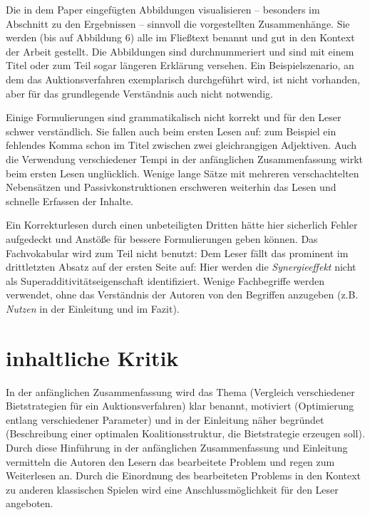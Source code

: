\documentclass[sigconf]{acmart}
\begin{document}
Die in dem Paper eingefügten Abbildungen visualisieren -- besonders im Abschnitt zu den Ergebnissen -- sinnvoll die vorgestellten Zusammenhänge. Sie werden (bis auf Abbildung 6) alle im Fließtext benannt und gut in den Kontext der Arbeit gestellt. Die Abbildungen sind durchnummeriert und sind mit einem Titel oder zum Teil sogar längeren Erklärung versehen. Ein Beispielszenario, an dem das Auktionsverfahren exemplarisch durchgeführt wird, ist nicht vorhanden, aber für das grundlegende Verständnis auch nicht notwendig.

Einige Formulierungen sind grammatikalisch nicht korrekt und für den Leser schwer verständlich. Sie fallen auch beim ersten Lesen auf: zum Beispiel ein fehlendes Komma schon im Titel zwischen zwei gleichrangigen Adjektiven. Auch die Verwendung verschiedener Tempi in der anfänglichen Zusammenfassung wirkt beim ersten Lesen unglücklich. Wenige lange Sätze mit mehreren verschachtelten Nebensätzen und Passivkonstruktionen erschweren weiterhin das Lesen und schnelle Erfassen der Inhalte.

Ein Korrekturlesen durch einen unbeteiligten Dritten hätte hier sicherlich Fehler aufgedeckt und Anstöße für bessere Formulierungen geben können. Das Fachvokabular wird zum Teil nicht benutzt: Dem Leser fällt das prominent im drittletzten Absatz auf der ersten Seite auf: Hier werden die \textit{Synergieeffekt} nicht als Superadditivitätseigenschaft identifiziert. Wenige Fachbegriffe werden verwendet, ohne das Verständnis der Autoren von den Begriffen anzugeben (z.B. \textit{Nutzen} in der Einleitung und im Fazit).


\section{inhaltliche Kritik}
\label{inhalt}
In der anfänglichen Zusammenfassung wird das Thema (Vergleich verschiedener Bietstrategien für ein Auktionsverfahren) klar benannt, motiviert (Optimierung entlang verschiedener Parameter) und in der Einleitung näher begründet (Beschreibung einer optimalen Koalitionsstruktur, die Bietstrategie erzeugen soll).   Durch diese Hinführung in der anfänglichen Zusammenfassung und Einleitung vermitteln die Autoren den Lesern das bearbeitete Problem und regen zum Weiterlesen an. Durch die Einordnung des bearbeiteten Problems in den Kontext zu anderen klassischen Spielen wird eine Anschlussmöglichkeit für den Leser angeboten.
\end{document}
